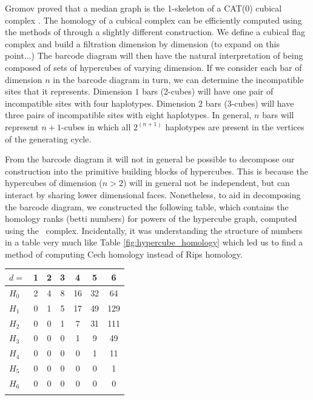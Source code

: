 Gromov proved that a median graph is the 1-skeleton of a CAT(0) cubical complex \citep{Gromov:1987}.
The homology of a cubical complex can be efficiently computed using the methods of \citet{Kaczynski:2004} through a slightly different construction.
We define a cubical flag complex and build a filtration dimension by dimension (to expand on this point...)
The barcode diagram will then have the natural interpretation of being composed of sets of hypercubes of varying dimension.
If we consider each bar of dimension $n$ in the barcode diagram in turn, we can determine the incompatible sites that it represents.
Dimension $1$ bars ($2$-cubes) will have one pair of incompatible sites with four haplotypes.
Dimension $2$ bars ($3$-cubes) will have three pairs of incompatible sites with eight haplotypes.
In general, $n$ bars will represent $n+1$-cubes in which all $2^{(n+1)}$ haplotypes are present in the vertices of the generating cycle.

From the barcode diagram it will not in general be possible to decompose our construction into the primitive building blocks of hypercubes.
This is because the hypercubes of dimension ($n>2$) will in general not be independent, but can interact by sharing lower dimensional faces.
Nonetheless, to aid in decomposing the barcode diagram, we constructed the following table, which contains the homology ranks (betti numbers) for powers of the hypercube graph, computed using the \Cech\ complex.
Incidentally, it was understanding the structure of numbers in a table very much like Table \ref{fig:hypercube_homology} which led us to find a method of computing Cech homology instead of Rips homology.

\begin{center}
\begin{tabular}{lcccccc}
$d=$    & 1 & 2 & 3 &  4 &  5 & 6\\
\toprule
$H_{0}$ & 2 & 4 & 8 & 16 & 32 & 64\\
\midrule
$H_{1}$ & 0 & 1 & 5 & 17 & 49 & 129\\
\midrule
$H_{2}$ & 0 & 0 & 1 &  7 & 31 & 111\\
\midrule
$H_{3}$ & 0 & 0 & 0 &  1 &  9 & 49\\
\midrule
$H_{4}$ & 0 & 0 & 0 & 0 &  1 & 11\\
\midrule
$H_{5}$ & 0 & 0 & 0 & 0 &  0 &  1\\
\midrule
$H_{6}$ & 0 & 0 & 0 & 0 & 0 &  0\\
\bottomrule
\label{fig:hypercube_homology}
\end{tabular}
\end{center}

